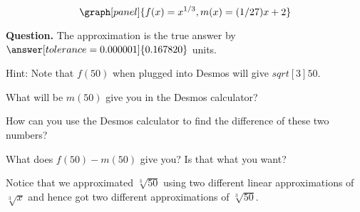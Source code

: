 \documentclass[handout,nooutcomes]{ximera}
\begin{document}
\begin{example}
\begin{explanation}
\[
\graph[panel]{f(x) = x^{1/3}, m(x) = (1/27) x + 2}
\]


\textbf{Question. } The approximation is  the true 
answer by $\answer[tolerance=0.000001]{0.167820}$ units.

\begin{expandable}
Hint: Note that $f(50)$ when plugged into Desmos will give $sqrt[3]{50}$.
\begin{expandable}
What will be $m(50)$ give you in the Desmos calculator?
\begin{expandable}
How can you use the Desmos calculator to find the difference of these two numbers?
\begin{expandable}
What does $f(50)-m(50)$ give you? Is that what you want?
\end{expandable}
\end{expandable}
\end{expandable}
\end{expandable}

\end{explanation}
\end{example}

Notice that we approximated $\sqrt[3]{50}$ using two different
linear approximations of $\sqrt[3]{x}$ and hence got two different
approximations of $\sqrt[3]{50}$.
\end{document}
